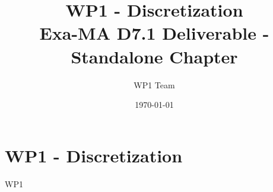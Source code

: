\documentclass[11pt]{report}
\begin{document}
\title{WP1 - Discretization\\
\large Exa-MA D7.1 Deliverable - Standalone Chapter}
\author{WP1 Team}
\date{\today}
\maketitle

\tableofcontents
\clearpage


\chapter{WP1 - Discretization}
\label{chap:wp1}

{WP1}


\clearpage


\end{document}
